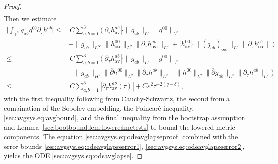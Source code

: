 \documentclass{article}
\newcommand{\TT}{\mathbb{T}}
\newcommand{\osc}{\mathrm{osc}}
\newcommand{\av}{\mathrm{av}}
\newcommand{\ol}{\overline}
\newcommand{\ve}{\varepsilon}
\newcommand{\pa}{\partial}
\begin{document}
\begin{proof}
\begin{align}
\end{align}
Then we estimate
\begin{align}
    \Big|\int_{\TT^3}g_{ab}g^{00}\pa_\tau  h^{ab}\Big| \leq&\> C\sum_{a,b = 1}^3\Big(|\pa_\tau h_{\av}^{ab}|\cdot \|g_{ab}\|_{L^2}\|g^{00}\|_{L^2}\nonumber\\
    &+ \|g_{ab}\|_{L^\infty}\|h_{\osc}^{00}\|_{L^2}\|\pa_\tau h_{\osc}^{ab}\|_{L^2} + |h_{\av}^{00}|\cdot\|(g_{ab})_{\osc}\|_{L^2}\|\pa_\tau h_{\osc}^{ab}\|\Big)\nonumber\\
    \leq&\>C\sum_{a,b=1}^3\Big(|\pa_\tau h_{\av}^{ab}|\cdot\|g_{ab}\|_{L^2}\|g^{00}\|_{L^2}\nonumber\\
    &+\|g_{ab}\|_{H^2}\|\ol{\pa} h^{00}\|_{L^2}\|\pa_\tau h^{ab}\|_{L^2}+\|h^{00}\|_{L^2}\|\ol{\pa} g_{ab}\|_{L^2}\|\pa_\tau h^{ab}\|_{L^2}\Big)\nonumber\\\leq&\> C\sum_{a,b=1}^3|\pa_\tau h_{\av}^{ab}(\tau)| + C\ve^2 \tau^{-2(q-\delta)},\label{sec:avgsys.eq:odeavglapseerror2}
\end{align}
with the first inequality following from Cauchy-Schwartz, the second from a combination of the Sobolev embedding, the Poincar\'e inequality, \eqref{sec:avgsys.eq:avgbound}, and the final inequality from the bootstrap assumption and Lemma~\ref{sec:bootbound.lem:loweredmetests} to bound the lowered metric components. 
The equation \eqref{sec:avgsys.eq:odeavglapseproof} combined with the error bounds \eqref{sec:avgsys.eq:odeavglapseerror1}, \eqref{sec:avgsys.eq:odeavglapseerror2}, yields the ODE \eqref{sec:avgsys.eq:odeavglapse}.


\end{proof}
\end{document}
